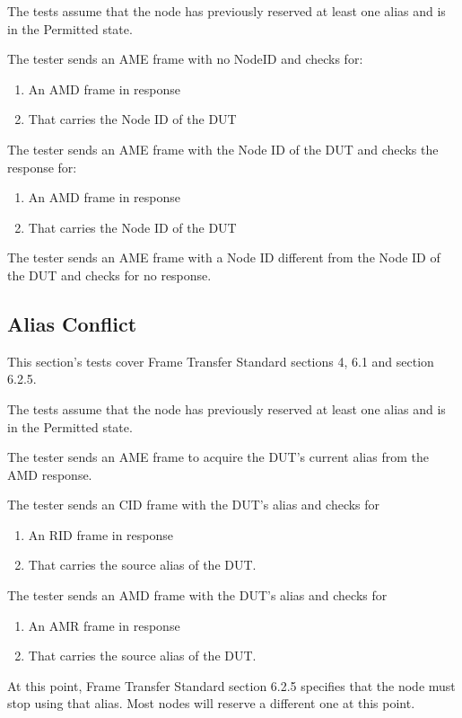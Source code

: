 \documentclass[11pt]{article}
\begin{document}
The tests assume that the node has previously reserved at least one alias
and is in the Permitted state.

The tester sends an AME frame with no NodeID and checks for:
\begin{enumerate}
\item An AMD frame in response
\item That carries the Node ID of the DUT
\end{enumerate}

The tester sends an AME frame with the Node ID of the DUT and checks the response for:
\begin{enumerate}
\item An AMD frame in response
\item That carries the Node ID of the DUT
\end{enumerate}

The tester sends an AME frame with a Node ID different from the Node ID of the DUT 
and checks for no response.


\subsection{Alias Conflict}

This section's tests cover Frame Transfer Standard sections 4, 6.1 and section 6.2.5.

The tests assume that the node has previously reserved at least one alias
and is in the Permitted state.

The tester sends an AME frame to acquire the DUT's current alias from the AMD
response.

The tester sends an CID frame with the DUT's alias and checks for
\begin{enumerate}
\item An RID frame in response
\item That carries the source alias of the DUT.
\end{enumerate}

The tester sends an AMD frame with the DUT's alias and checks for
\begin{enumerate}
\item An AMR frame in response
\item That carries the source alias of the DUT.
\end{enumerate}

At this point, Frame Transfer Standard section 6.2.5 specifies that the node must stop
using that alias.  Most nodes will reserve a different one at this point.
\end{document}
